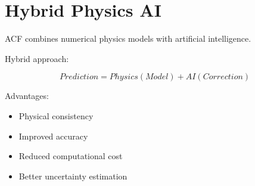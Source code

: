 \section{Hybrid Physics AI}


ACF combines numerical physics models with artificial
intelligence.



Hybrid approach:


\begin{equation}
Prediction =
Physics(Model)
+
AI(Correction)
\end{equation}



Advantages:


\begin{itemize}

\item Physical consistency

\item Improved accuracy

\item Reduced computational cost

\item Better uncertainty estimation

\end{itemize}
